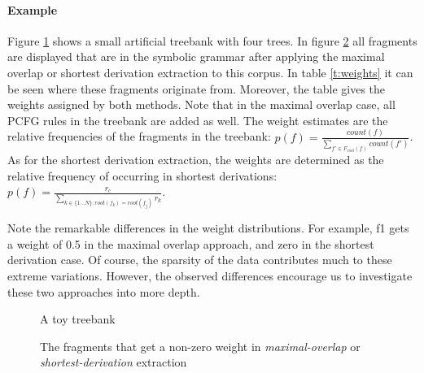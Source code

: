 \paragraph{Example}
\FloatBarrier
Figure \ref{f:treebank} shows a small artificial treebank with four trees. In figure \ref{f:fragments} all fragments are displayed that are in the symbolic grammar after applying the maximal overlap or shortest derivation extraction to this corpus. In table \ref{t:weights} it can be seen where these fragments originate from. Moreover, the table gives the weights assigned by both methods. Note that in the maximal overlap case, all PCFG rules in the treebank are added as well. The weight estimates are the relative frequencies of the fragments in the treebank: $p(f)=\frac{count(f)}{\sum_{f'\in F_{root}(f)} count(f')}$\cite{sangati2011}. As for the shortest derivation extraction, the weights are determined as the relative frequency of occurring in shortest derivations: $p(f)=\frac{r_c}{\sum_{k\in \{1\ldots N\}:root(f_k)=root(f_j)} r_k}$\cite{zollmann2005}.

Note the remarkable differences in the weight distributions. For example, f1 gets a weight of 0.5 in the maximal overlap approach, and zero in the shortest derivation case. Of course, the sparsity of the data contributes much to these extreme variations. However, the observed differences encourage us to investigate these two approaches into more depth.


\begin{figure}[h!]
\center 
\caption{A toy treebank} \label{f:treebank}
\end{figure}

\begin{figure}[h!]
\center 
\caption{The fragments that get a non-zero weight in \emph{maximal-overlap} or \emph{shortest-derivation} extraction}
\label{f:fragments}
\end{figure}

